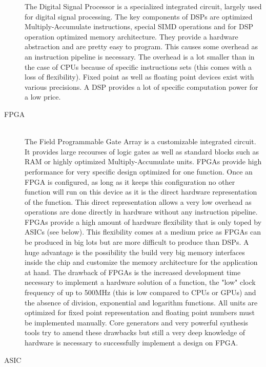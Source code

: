 \documentclass[mscthesis]{usiinfthesis}
\begin{document}
\begin{description}
        The Digital Signal Processor is a specialized integrated circuit,
        largely used for digital signal processing. The key components of DSPs
        are optimized Multiply-Accumulate instructions, special SIMD operations
        and for DSP operation optimized memory architecture. They provide
        a hardware abstraction and are pretty easy to program. This causes
        some overhead as an instruction pipeline is necessary. The overhead is
        a lot smaller than in the case of CPUs because of specific instructions
        sets (this comes with a loss of flexibility). Fixed point as well as
        floating point devices exist with various precisions. A DSP provides
        a lot of specific computation power for a low price.
    \item[FPGA] \hfill \\
        The Field Programmable Gate Array is a customizable integrated circuit.
        It provides large recourses of logic gates as well as standard blocks
        such as RAM or highly optimized Multiply-Accumulate units. FPGAs
        provide high performance for very specific design optimized for one
        function. Once an FPGA is configured, as long as it keeps this
        configuration no other function will run on this device as it is the
        direct hardware representation of the function. This direct
        representation allows a very low overhead as operations are done
        directly in hardware without any instruction pipeline. FPGAs provide
        a high amount of hardware flexibility that is only toped by ASICs (see
        below). This flexibility comes at a medium price as FPGAs can be
        produced in big lots but are more difficult to produce than DSPs.
        A huge advantage is the possibility the build very big memory
        interfaces inside the chip and customize the memory architecture for
        the application at hand. The drawback of FPGAs is the increased
        development time necessary to implement a hardware solution of
        a function, the "low" clock frequency of up to 500MHz (this is low
        compared to CPUs or GPUs) and the absence of division, exponential and
        logarithm functions. All units are optimized for fixed point
        representation and floating point numbers must be implemented manually.
        Core generators and very powerful synthesis tools try to amend these
        drawbacks but still a very deep knowledge of hardware is necessary to
        successfully implement a design on FPGA.
    \item[ASIC] \hfill \\

\end{description}
\end{document}

